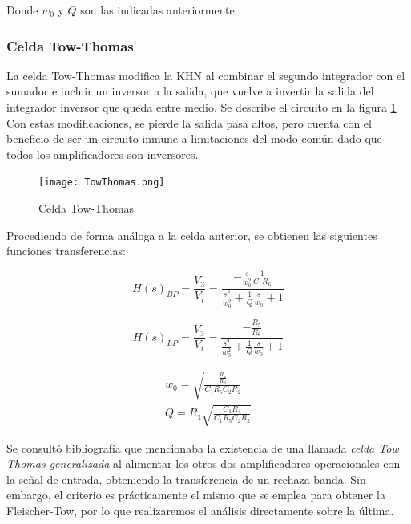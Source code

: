 Donde $w_{0}$ y $Q$ son las indicadas anteriormente. 

\subsubsection{Celda Tow-Thomas}

La celda Tow-Thomas modifica la KHN al combinar el segundo integrador con el sumador e incluir un inversor a la  salida,  que vuelve a invertir la salida del integrador inversor que queda entre medio. Se describe el circuito en la figura \ref{fig:TowThomas} Con estas modificaciones, se pierde la salida pasa altos, pero cuenta con el beneficio de ser un circuito inmune a limitaciones del modo común dado que todos los amplificadores son inversores. 

\begin{figure}[H]
    \centering
    \texttt{[image: TowThomas.png]}
    \caption{Celda Tow-Thomas}
    \label{fig:TowThomas}
\end{figure}

Procediendo de forma análoga a la celda anterior, se obtienen las siguientes funciones transferencias:

\begin{equation}
        H(s)_{BP} = \frac{V_{3}}{V_{i}} = \frac{-\frac{s}{w_{0}^{2}}\frac{1}{C_{1}R_{6}}}{\frac{s^{2}}{w_{0}^{2}} + \frac{1}{Q} \frac{s}{w_{0}} + 1}
    \label{eq:TowThomas1}
\end{equation}

\begin{equation}
        H(s)_{LP} = \frac{V_{3}}{V_{i}} = \frac{-\frac{R_{5}}{R_{6}}}{\frac{s^{2}}{w_{0}^{2}} + \frac{1}{Q} \frac{s}{w_{0}} + 1}
    \label{eq:TowThomas2}
\end{equation}



\begin{equation}
    \begin{matrix}
        w_{0} = \sqrt{\frac{\frac{R_{4}}{R_{3}}}{C_{1}R_{5}C_{2}R_{2}}}
        \\
        Q = R_{1}\sqrt{\frac{C_{1}R_{4}}{C_{1}R_{5}C_{2}R_{2}}}
    \end{matrix}
    \label{eq:TowThomas1}
\end{equation}

Se consultó bibliografía que mencionaba la existencia de una llamada \emph{celda Tow Thomas generalizada} al alimentar los otros dos amplificadores operacionales con la señal de entrada, obteniendo la transferencia de un rechaza banda. Sin embargo, el criterio es prácticamente el mismo que se emplea para obtener la Fleischer-Tow, por lo que realizaremos el análisis directamente sobre la última. 

